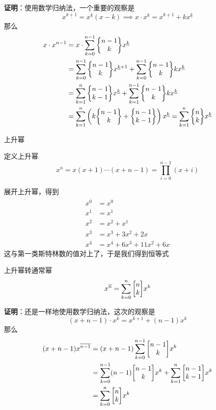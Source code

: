 \documentclass[UTF8]{beamer}
\begin{document}
    \begin{frame}
        \textbf{证明}：使用数学归纳法，一个重要的观察是
        $$
        x^{\underline{k+1}} = x^{\underline k}(x-k)\implies x\cdot x^{\underline k} = x^{\underline {k+1}}+kx^{\underline k}
        $$
        \pause
        那么
        $$
        \begin{aligned}
        x\cdot x^{n-1}&=x\cdot \sum_{k=0}^{n-1}\St{n-1}k x^{\underline k}\\
        &=\sum_{k=0}^{n-1}\St{n-1}k x^{\underline k+1}+\sum_{k=0}^{n-1}\St{n-1}k kx^{\underline k}\\
        &=\sum_{k=1}^{n}\St{n-1}{k-1}x^{\underline k}+\sum_{k=1}^{n-1}\St{n-1}k kx^{\underline k}\\
        &=\sum_{k=1}^{n}\left(k\St{n-1}k+\St{n-1}{k-1}\right)x^{\underline k} = \sum_{k=1}^{n}\St{n}k x^{\underline k}
        \end{aligned}
        $$
    \end{frame}
    \begin{frame}{上升幂}
        
        \small{
        定义上升幂
        \vspace{-0.5em}
        $$
        x^{\overline n} = x(x+1)\cdots(x+n-1) = \prod_{i=0}^{n-1}(x+i) 
        $$
        \vspace{-0.8em}
        
        展开上升幂，得到
        $$
        \begin{aligned}
        x^{\overline{0}} &= x^0\\
        x^{\overline{1}} &= x^1\\
        x^{\overline{2}} &= x^2+x^1\\
        x^{\overline{3}} &= x^3+3x^2+2x\\
        x^{\overline{4}} &= x^4+6x^3+11x^2+6x
        \end{aligned}
        $$
        \pause
        这与第一类斯特林数的值对上了，于是我们得到恒等式
        \begin{block}{上升幂转通常幂}
            \vspace{-1em}
            $$
            x^{\overline n} = \sum_{k=0}^n \st{n}k x^{k}
            $$
        \vspace{-1em}
        \end{block}
        }
    \end{frame}
    \begin{frame}
        \textbf{证明}：还是一样地使用数学归纳法，这次的观察是
        $$
        (x+n-1)\cdot x^k = x^{k+1}+(n-1)x^k
        $$
        那么
        $$
        \begin{aligned}
        (x+n-1)x^{\overline{n-1}} &= (x+n-1)\sum_{k=0}^{n-1} \st {n-1}kx^k\\
        &=\sum_{k=0}^{n-1}(n-1)\st{n-1}k x^k +\sum_{k=1}^n\st{n-1}{k-1}x^k\\
        &=\sum_{k=0}^n\st nk x^k
        \end{aligned}
        $$
    \end{frame}
\end{document}
